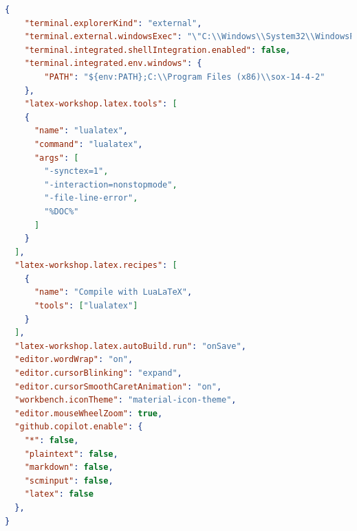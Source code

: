 \newpage



\newpage

\begin{lstlisting}[language=json]
{
    "terminal.explorerKind": "external",
    "terminal.external.windowsExec": "\"C:\\Windows\\System32\\WindowsPowerShell\\v1.0\\powershell.exe\"",
    "terminal.integrated.shellIntegration.enabled": false,
    "terminal.integrated.env.windows": {
        "PATH": "${env:PATH};C:\\Program Files (x86)\\sox-14-4-2"
    },
    "latex-workshop.latex.tools": [
    {
      "name": "lualatex",
      "command": "lualatex",
      "args": [
        "-synctex=1",
        "-interaction=nonstopmode",
        "-file-line-error",
        "%DOC%"
      ]
    }
  ],
  "latex-workshop.latex.recipes": [
    {
      "name": "Compile with LuaLaTeX",
      "tools": ["lualatex"]
    }
  ],
  "latex-workshop.latex.autoBuild.run": "onSave",
  "editor.wordWrap": "on",
  "editor.cursorBlinking": "expand",
  "editor.cursorSmoothCaretAnimation": "on",
  "workbench.iconTheme": "material-icon-theme",
  "editor.mouseWheelZoom": true,
  "github.copilot.enable": {
    "*": false,
    "plaintext": false,
    "markdown": false,
    "scminput": false,
    "latex": false
  },
}
\end{lstlisting}

\newpage

